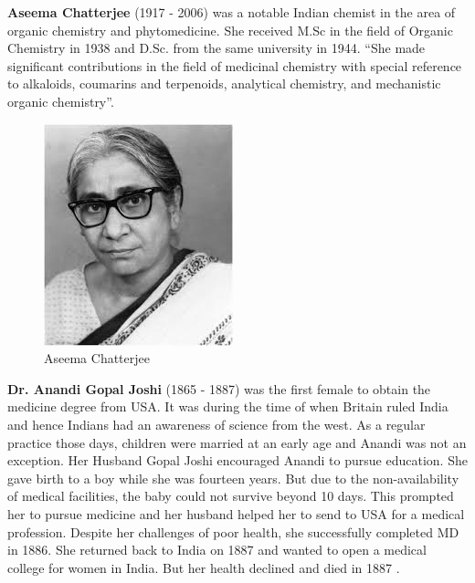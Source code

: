 \documentclass[a4paper,10pt]{article}
\begin{document}
\newblock
\textbf{Aseema Chatterjee} (1917 - 2006) was a notable Indian chemist in the area of organic chemistry and phytomedicine. She received M.Sc in the field of Organic Chemistry in 1938 and D.Sc. from the same university in 1944. ``She made significant contributions in the field of medicinal chemistry with special reference to alkaloids, coumarins and terpenoids, analytical chemistry, and mechanistic organic chemistry''.  \cite{chaterjee}

\begin{center}
\begin{figure}[h]
\centering
 \includegraphics[scale=0.6]{aseema.jpg}
 \caption{Aseema Chatterjee}
\end{figure}
\end{center}

\newblock
\textbf{Dr. Anandi Gopal Joshi} (1865 - 1887) was the first female to obtain the medicine degree from USA. It was during the time of when Britain ruled India and hence Indians had an awareness of science from the west. As a regular practice those days, children were married at an early age and Anandi was not an exception. Her Husband Gopal Joshi encouraged Anandi to pursue education. She gave birth to a boy while she was fourteen years. But due to the non-availability of medical facilities, the baby could not survive beyond 10 days. This prompted her to pursue medicine and her husband helped her to send to USA for a medical profession. Despite her challenges of poor health, she successfully completed MD in 1886. She returned back to India on 1887 and wanted to open a medical college for women in India. But her health declined and died in 1887  \cite{joshi}.
\end{document}
